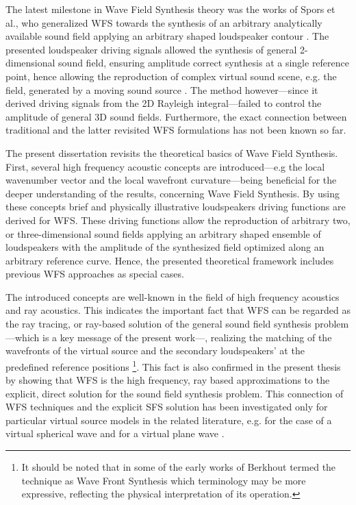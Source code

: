 The latest milestone in Wave Field Synthesis theory was the works of Spors et al., who generalized WFS towards the synthesis of an arbitrary analytically available sound field applying an arbitrary shaped loudspeaker contour \cite{Spors2008:WFSrevisited, Rabenstein2007}.
The presented loudspeaker driving signals allowed the synthesis of general 2-dimensional sound field, ensuring amplitude correct synthesis at a single reference point,
hence allowing the reproduction of complex virtual sound scene, e.g. the field, generated by a moving sound source \cite{Ahrens2008moving, Ahrens2008moving_b}.
The method however---since it derived driving signals from the 2D Rayleigh integral---failed to control the amplitude of general 3D sound fields.
Furthermore, the exact connection between traditional and the latter revisited WFS formulations has not been known so far.

\vspace{3mm}
The present dissertation revisits the theoretical basics of Wave Field Synthesis.
First, several high frequency acoustic concepts are introduced---e.g the local wavenumber vector and the local wavefront curvature---being beneficial for the deeper understanding of the results, concerning Wave Field Synthesis.
By using these concepts brief and physically illustrative loudspeakers driving functions are derived for WFS.
These driving functions allow the reproduction of arbitrary two, or three-dimensional sound fields applying an arbitrary shaped ensemble of loudspeakers with the amplitude of the synthesized field optimized along an arbitrary reference curve.
Hence, the presented theoretical framework includes previous WFS approaches as special cases.

The introduced concepts are well-known in the field of high frequency acoustics and ray acoustics.
This indicates the important fact that WFS can be regarded as the ray tracing, or ray-based solution of the general sound field synthesis problem---which is a key message of the present work---, realizing the matching of the wavefronts of the virtual source and the secondary loudspeakers' at the predefined reference positions \footnote{It should be noted that in some of the early works of Berkhout termed the technique as Wave Front Synthesis \cite{berkhout1992wave, doi:10.1121/1.404755} which terminology may be more expressive, reflecting the physical interpretation of its operation.}.
This fact is also confirmed in the present thesis by showing that WFS is the high frequency, ray based approximations to the explicit, direct solution for the sound field synthesis problem.
This connection of WFS techniques and the explicit SFS solution has been investigated only for particular virtual source models in the related literature, e.g. for the case of a virtual spherical wave \cite{Spors2010:analysis_and_improvement} and for a virtual plane wave \cite{Schultz2016:DAGA}.

